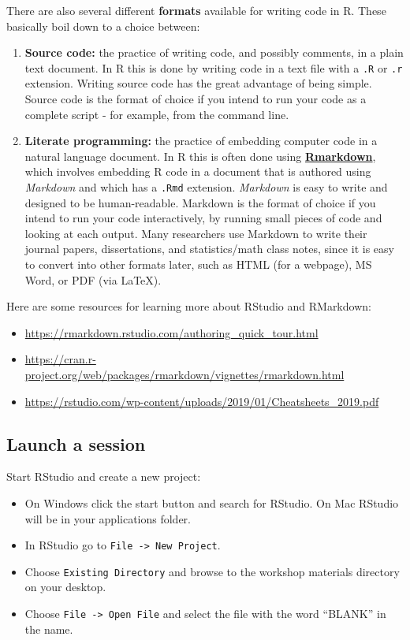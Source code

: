\documentclass[
]{book}
\providecommand{\tightlist}{%
  \setlength{\itemsep}{0pt}\setlength{\parskip}{0pt}}
\begin{document}
There are also several different \textbf{formats} available for writing code in R. These basically boil down to a choice between:

\begin{enumerate}
\def\labelenumi{\arabic{enumi}.}
\item
  \textbf{Source code:} the practice of writing code, and possibly comments, in a plain text document. In R this is done by writing code in a text file with a \texttt{.R} or \texttt{.r} extension. Writing source code has the great advantage of being simple. Source code is the format of choice if you intend to run your code as a complete script - for example, from the command line.
\item
  \textbf{Literate programming:} the practice of embedding computer code in a natural language document. In R this is often done using \href{https://rmarkdown.rstudio.com/}{\textbf{Rmarkdown}}, which involves embedding R code in a document that is authored using \emph{Markdown} and which has a \texttt{.Rmd} extension. \emph{Markdown} is easy to write and designed to be human-readable. Markdown is the format of choice if you intend to run your code interactively, by running small pieces of code and looking at each output. Many researchers use Markdown to write their journal papers, dissertations, and statistics/math class notes, since it is easy to convert into other formats later, such as HTML (for a webpage), MS Word, or PDF (via LaTeX).
\end{enumerate}

Here are some resources for learning more about RStudio and RMarkdown:

\begin{itemize}
\tightlist
\item
  \url{https://rmarkdown.rstudio.com/authoring_quick_tour.html}
\item
  \url{https://cran.r-project.org/web/packages/rmarkdown/vignettes/rmarkdown.html}
\item
  \url{https://rstudio.com/wp-content/uploads/2019/01/Cheatsheets_2019.pdf}
\end{itemize}

\hypertarget{launch-a-session}{%
\subsection{Launch a session}\label{launch-a-session}}

Start RStudio and create a new project:

\begin{itemize}
\tightlist
\item
  On Windows click the start button and search for RStudio. On Mac RStudio will be in your applications folder.
\item
  In RStudio go to \texttt{File\ -\textgreater{}\ New\ Project}.
\item
  Choose \texttt{Existing\ Directory} and browse to the workshop materials directory on your desktop.
\item
  Choose \texttt{File\ -\textgreater{}\ Open\ File} and select the file with the word ``BLANK'' in the name.
\end{itemize}
\end{document}
